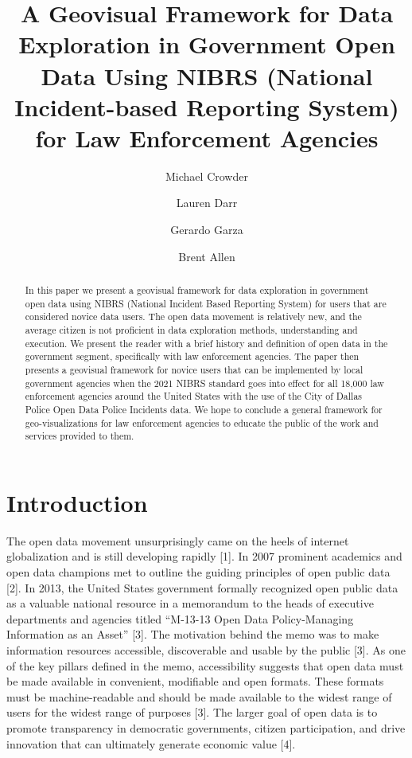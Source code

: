 \documentclass[runningheads]{llncs}
\begin{document}
%
\title{A Geovisual Framework for Data Exploration in Government Open Data Using NIBRS (National Incident-based Reporting System) for Law Enforcement Agencies}
%
%
\author{Michael Crowder\and
Lauren Darr\and
Gerardo Garza\and
Brent Allen}
%
%
%
\maketitle              %
%
\begin{abstract}
In this paper we present a geovisual framework for data exploration in government open data using NIBRS (National Incident Based Reporting System) for users that are considered novice data users. The open data movement is relatively new, and the average citizen is not proficient in data exploration methods, understanding and execution. We present the reader with a brief history and definition of open data in the government segment, specifically with law enforcement agencies. The paper then presents a geovisual framework for novice users that can be implemented by local government agencies when the 2021 NIBRS standard goes into effect for all 18,000 law enforcement agencies around the United States with the use of the City of Dallas Police Open Data Police Incidents data. We hope to conclude a general framework for geo-visualizations for law enforcement agencies to educate the public of the work and services provided to them.

\end{abstract}
%
%
%
\section{Introduction}
The open data movement unsurprisingly came on the heels of internet globalization and is still developing rapidly [1]. In 2007 prominent academics and open data champions met to outline the guiding principles of open public data [2]. In 2013, the United States government formally recognized open public data as a valuable national resource in a memorandum to the heads of executive departments and agencies titled “M-13-13 Open Data Policy-Managing Information as an Asset” [3]. The motivation behind the memo was to make information resources accessible, discoverable and usable by the public [3]. As one of the key pillars defined in the memo, accessibility suggests that open data must be made available in convenient, modifiable and open formats. These formats must be machine-readable and should be made available to the widest range of users for the widest range of purposes [3]. The larger goal of open data is to promote transparency in democratic governments, citizen participation, and drive innovation that can ultimately generate economic value [4]. 
\end{document}
